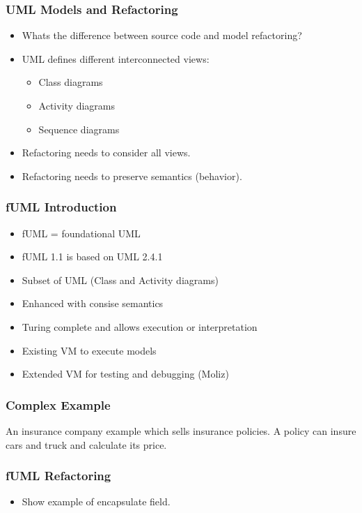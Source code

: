 \documentclass{beamer}
\begin{document}
\begin{frame}
\frametitle{UML Models and Refactoring}
\begin{itemize}
 \item Whats the difference between source code and model refactoring?
 \item UML defines different interconnected views:
 \begin{itemize}
  \item Class diagrams
  \item Activity diagrams
  \item Sequence diagrams
 \end{itemize}
 \item Refactoring needs to consider all views.
 \item Refactoring needs to preserve semantics (behavior).
\end{itemize}
        
\end{frame}
        
\begin{frame}
\frametitle{fUML Introduction}
\begin{itemize}
 \item fUML = foundational UML
 \item fUML 1.1 is based on UML 2.4.1
 \item Subset of UML (Class and Activity diagrams)
 \item Enhanced with consise semantics
 \item Turing complete and allows execution or interpretation
 \item Existing VM to execute models
 \item Extended VM for testing and debugging (Moliz)
\end{itemize}

\end{frame}
        
\begin{frame}
\frametitle{Complex Example}
An insurance company example which sells insurance policies. A policy can insure cars and truck and calculate its price.
\begin{figure}
\end{figure}
\end{frame}
        
\begin{frame}
\frametitle{fUML Refactoring}
    \begin{itemize}
     \item Show example of encapsulate field.
    \end{itemize}
\end{frame}
        
\end{document}
